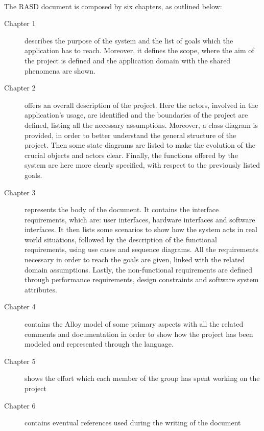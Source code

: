 			\paragraph{}
				The RASD document is composed by six chapters, as outlined below:
			\begin{description}
				\item[Chapter 1] describes the purpose of the system and the list of goals which the application has to reach. Moreover, it defines the scope, where the aim of the project is defined and the application domain with the shared phenomena are shown.
				\item[Chapter 2] offers an overall description of the project. Here the actors, involved in the application's usage, are identified and the boundaries of the project are defined, listing all the necessary assumptions. Moreover, a class diagram is provided, in order to better understand the general structure of the project. Then some state diagrams are listed to make the evolution of the crucial objects and actors clear. Finally, the functions offered by the system are here more clearly specified, with respect to the previously listed goals.
				\item[Chapter 3] represents the body of the document. It contains the interface requirements, which are: user interfaces, hardware interfaces and software interfaces. It then lists some scenarios to show how the system acts in real world situations, followed by the description of the functional requirements, using use cases and sequence diagrams. All the requirements necessary in order to reach the goals are given, linked with the related domain assumptions. Lastly, the non-functional requirements are defined through performance requirements, design constraints and software system attributes.
				\item[Chapter 4] contains the Alloy model of some primary aspects with all the related comments and documentation in order to show how the project has been modeled and represented through the language.
				\item[Chapter 5] shows the effort which each member of the group has spent working on the project
				\item[Chapter 6] contains eventual references used during the writing of the document
			\end{description}